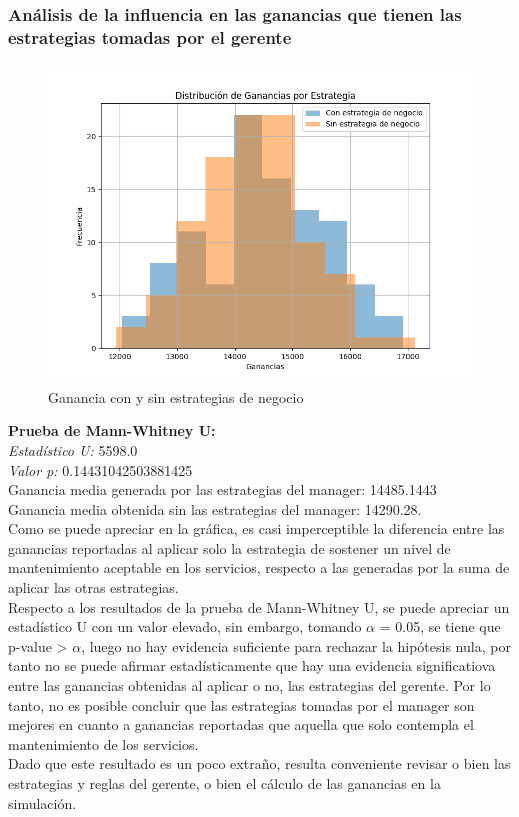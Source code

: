 \documentclass[12pt,a4paper]{article} \usepackage[spanish]{babel} \usepackage{graphicx} \usepackage{amsmath} \usepackage{amsfonts} \usepackage{amssymb} \usepackage{float} \usepackage{geometry}
\begin{document}
\subsubsection{Análisis de la influencia en las ganancias que tienen las estrategias tomadas por el gerente}
\begin{figure}[H] \centering \includegraphics[width=\textwidth]{estrategias manager} \caption{Ganancia con y sin estrategias de negocio} \label{fig:etiqueta} \end{figure}

\textbf{Prueba de Mann-Whitney U:}\\
\textit{Estadístico U:} 5598.0\\
\textit{Valor p:} 0.14431042503881425\\
Ganancia media generada por las estrategias del manager: 14485.1443\\
Ganancia media obtenida sin las estrategias del manager: 14290.28.\\

Como se puede apreciar en la gráfica, es casi imperceptible la diferencia entre las ganancias reportadas al aplicar solo la estrategia de sostener un nivel de mantenimiento aceptable en los servicios, respecto a las generadas por la suma de aplicar las otras estrategias.\\

Respecto a los resultados de la prueba de Mann-Whitney U, se puede apreciar un estadístico U con un valor elevado, sin embargo, tomando $\alpha$ = 0.05, se tiene que p-value > $\alpha$, luego no hay evidencia suficiente para rechazar la hipótesis nula, por tanto no se puede afirmar estadísticamente que hay una evidencia significatiova entre las ganancias obtenidas al aplicar o no, las estrategias del gerente. Por lo tanto, no es posible concluir que las estrategias tomadas por el manager son mejores en cuanto a ganancias reportadas que aquella que solo contempla el mantenimiento de los servicios.\\
Dado que este resultado es un poco extraño, resulta conveniente revisar o bien las estrategias y reglas del gerente, o bien el cálculo de las ganancias en la simulación.
\end{document}
